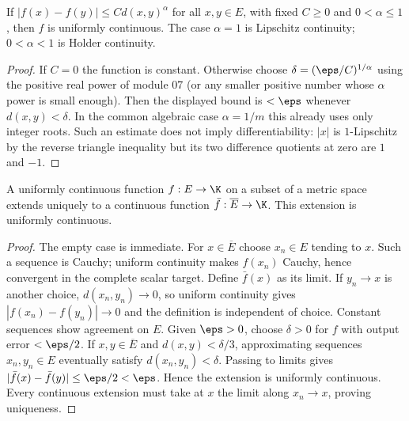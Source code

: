 \begin{proposition}
If $|f(x)-f(y)|\le C d(x,y)^\alpha$ for all $x,y\in E$, with fixed $C\ge0$ and $0<\alpha\le1$, then $f$ is uniformly continuous. The case $\alpha=1$ is Lipschitz continuity; $0<\alpha<1$ is Holder continuity.
\end{proposition}
\begin{proof}
If $C=0$ the function is constant. Otherwise choose $\delta=(\eps/C)^{1/\alpha}$ using the positive real power of module 07 (or any smaller positive number whose $\alpha$ power is small enough). Then the displayed bound is $<\eps$ whenever $d(x,y)<\delta$. In the common algebraic case $\alpha=1/m$ this already uses only integer roots. Such an estimate does not imply differentiability: $|x|$ is $1$-Lipschitz by the reverse triangle inequality but its two difference quotients at zero are $1$ and $-1$.
\end{proof}

\begin{theorem}
A uniformly continuous function $f:E\to\K$ on a subset of a metric space extends uniquely to a continuous function $\bar f:\overline E\to\K$. This extension is uniformly continuous.
\end{theorem}
\begin{proof}
The empty case is immediate. For $x\in\overline E$ choose $x_n\in E$ tending to $x$. Such a sequence is Cauchy; uniform continuity makes $f(x_n)$ Cauchy, hence convergent in the complete scalar target. Define $\bar f(x)$ as its limit. If $y_n\to x$ is another choice, $d(x_n,y_n)\to0$, so uniform continuity gives $|f(x_n)-f(y_n)|\to0$ and the definition is independent of choice. Constant sequences show agreement on $E$.
Given $\eps>0$, choose $\delta>0$ for $f$ with output error $<\eps/2$. If $x,y\in\overline E$ and $d(x,y)<\delta/3$, approximating sequences $x_n,y_n\in E$ eventually satisfy $d(x_n,y_n)<\delta$. Passing to limits gives $|\bar f(x)-\bar f(y)|\le\eps/2<\eps$. Hence the extension is uniformly continuous. Every continuous extension must take at $x$ the limit along $x_n\to x$, proving uniqueness.
\end{proof}

